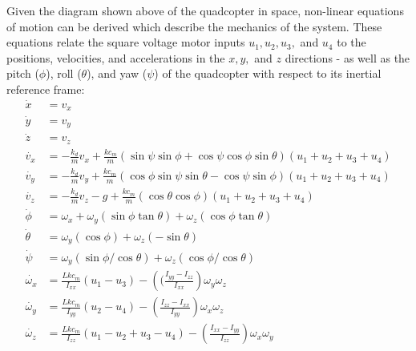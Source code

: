 \documentclass[12pt]{article}
\begin{document}
Given the diagram shown above of the quadcopter in space, non-linear equations of motion can be derived
which describe the mechanics of the system. These equations relate the square voltage motor inputs $u_1,u_2,u_3,$ and $u_4$ to
the positions, velocities, and accelerations in the $x,y,$ and $z$ directions - as well as the pitch ($\phi$), roll ($\theta$), 
and yaw ($\psi$) of the quadcopter with respect to its inertial reference frame:
\begin{align*}
    \dot{x} &= v_x \\
    \dot{y} &= v_y \\
    \dot{z} &= v_z \\
    \dot{v_x} &= -\frac{k_d}{m}v_x + \frac{kc_m}{m}(\sin\psi\sin\phi + \cos\psi\cos\phi\sin\theta)(u_1 + u_2 + u_3 + u_4) \\
    \dot{v_y} &= -\frac{k_d}{m}v_y + \frac{kc_m}{m}(\cos\phi\sin\psi\sin\theta - \cos\psi\sin\phi)(u_1 + u_2 + u_3 + u_4)\\
    \dot{v_z} &= -\frac{k_d}{m}v_z -g + \frac{kc_m}{m}(\cos\theta\cos\phi)(u_1 + u_2 + u_3 + u_4) \\
    \dot{\phi} &= \omega_x + \omega_y(\sin\phi\tan\theta) + \omega_z(\cos\phi\tan\theta) \\
    \dot{\theta} &= \omega_y(\cos\phi) + \omega_z(-\sin\theta) \\
    \dot{\psi} &= \omega_y(\sin\phi/\cos\theta) + \omega_z(\cos\phi/\cos\theta) \\
    \dot{\omega_x} &= \frac{Lkc_m}{I_{xx}}(u_1 - u_3) - \left((\frac{I_{yy} - I_{zz}}{I_{xx}}\right)\omega_y \omega_z \\
    \dot{\omega_y} &= \frac{Lkc_m}{I_{yy}}(u_2 - u_4) - \left(\frac{I_{zz} - I_{xx}}{I_{yy}}\right)\omega_x \omega_z \\
    \dot{\omega_z} &= \frac{Lkc_m}{I_{zz}}(u_1 - u_2 + u_3 - u_4) - \left(\frac{I_{xx} - I_{yy}}{I_{zz}}\right)\omega_x \omega_y \\
\end{align*}
\end{document}
